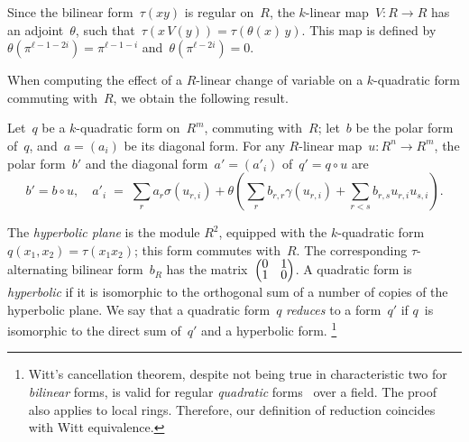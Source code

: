 \documentclass{amsart}
\def\pa#1{\left(#1\right)}
\def\mat#1{\begin{pmatrix}#1\end{pmatrix}}
\def\smat{\def\arraystretch{.66}\mat}
\begin{document}
Since the bilinear form~$τ(x y)$ is regular on~$R$, the $k$-linear
map~$V: R → R$ has an adjoint~$θ$, such that~$τ(x\, V(y)) = τ(θ(x)\, y)$.
This map is defined by~$θ(π^{ℓ-1-2i}) = π^{ℓ-1-i}$ and~$θ(π^{ℓ-2i}) = 0$.

When computing the effect of a $R$-linear change of variable on a
$k$-quadratic form commuting with~$R$, we obtain the following result.

\begin{prop}\label{prop:quad-changevar}
Let~$q$ be a $k$-quadratic form on~$R^m$, commuting with~$R$;
let~$b$ be the polar form of~$q$, and~$a = (a_i)$ be its diagonal form.
For any $R$-linear map~$u: R^n → R^m$,
the polar form~$b'$ and the diagonal form~$a' = (a'_i)$ of~$q' = q ∘ u$ are
\begin{equation*}
b' = b ∘ u, \quad
a'_i \;=\; ∑_r a_r σ(u_{r,i})
  + θ \pa{ ∑_r b_{r,r} γ(u_{r,i}) + ∑_{r < s} b_{r,s} u_{r,i} u_{s,i} }.
\end{equation*}
\end{prop}

The \emph{hyperbolic plane} is the module $R^2$, equipped with the
$k$-quadratic form $q(x_1, x_2) = τ(x_1 x_2)$; this form commutes with~$R$.
The corresponding $τ$-alternating bilinear form~$b_R$
has the matrix~$\smat{0&1\\1&0}$.
A quadratic form is \emph{hyperbolic} if it is isomorphic to
the orthogonal sum of a number of copies of the hyperbolic plane.
We say that a quadratic form~$q$ \emph{reduces} to a form~$q'$
if $q$~is isomorphic to the direct sum of~$q'$ and a hyperbolic form.%
\footnote{Witt's cancellation theorem,
despite not being true in characteristic two for \emph{bilinear} forms,
is valid for regular
\emph{quadratic} forms~\cite[Appendix 1]{milnorhusemoller} over a field.
The proof~\cite[I.4.1]{spinors} also applies to local rings.
Therefore, our definition of reduction coincides with Witt equivalence.}%
\end{document}
